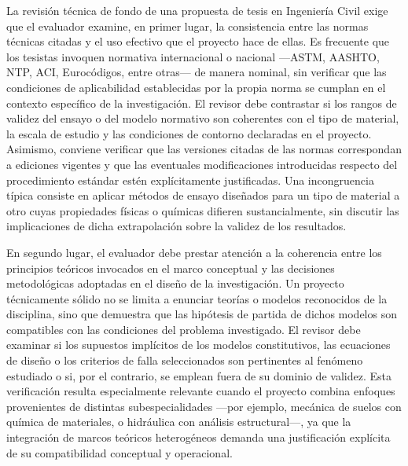 \documentclass[12pt,a4paper]{report}
\begin{document}
La revisión técnica de fondo de una propuesta de tesis en Ingeniería Civil exige que el evaluador examine, en primer lugar, la consistencia entre las normas técnicas citadas y el uso efectivo que el proyecto hace de ellas. Es frecuente que los tesistas invoquen normativa internacional o nacional ---ASTM, AASHTO, NTP, ACI, Eurocódigos, entre otras--- de manera nominal, sin verificar que las condiciones de aplicabilidad establecidas por la propia norma se cumplan en el contexto específico de la investigación. El revisor debe contrastar si los rangos de validez del ensayo o del modelo normativo son coherentes con el tipo de material, la escala de estudio y las condiciones de contorno declaradas en el proyecto. Asimismo, conviene verificar que las versiones citadas de las normas correspondan a ediciones vigentes y que las eventuales modificaciones introducidas respecto del procedimiento estándar estén explícitamente justificadas. Una incongruencia típica consiste en aplicar métodos de ensayo diseñados para un tipo de material a otro cuyas propiedades físicas o químicas difieren sustancialmente, sin discutir las implicaciones de dicha extrapolación sobre la validez de los resultados.

En segundo lugar, el evaluador debe prestar atención a la coherencia entre los principios teóricos invocados en el marco conceptual y las decisiones metodológicas adoptadas en el diseño de la investigación. Un proyecto técnicamente sólido no se limita a enunciar teorías o modelos reconocidos de la disciplina, sino que demuestra que las hipótesis de partida de dichos modelos son compatibles con las condiciones del problema investigado. El revisor debe examinar si los supuestos implícitos de los modelos constitutivos, las ecuaciones de diseño o los criterios de falla seleccionados son pertinentes al fenómeno estudiado o si, por el contrario, se emplean fuera de su dominio de validez. Esta verificación resulta especialmente relevante cuando el proyecto combina enfoques provenientes de distintas subespecialidades ---por ejemplo, mecánica de suelos con química de materiales, o hidráulica con análisis estructural---, ya que la integración de marcos teóricos heterogéneos demanda una justificación explícita de su compatibilidad conceptual y operacional.
\end{document}
